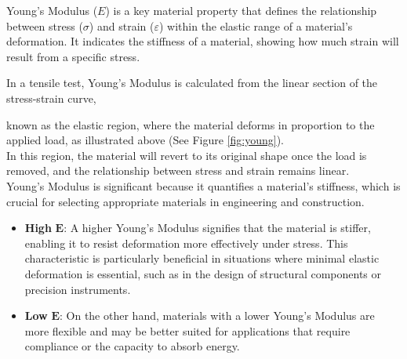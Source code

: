 \documentclass{article}
\begin{document}
{\begin{minipage}{\dimexpr\textwidth-0.55\textwidth\relax}
    Young's Modulus ($E$) is a key material property that defines the relationship between stress ($\sigma$) and strain ($\varepsilon$) within the elastic range of a material's deformation. It indicates the stiffness of a material, showing how much strain will result from a specific stress.
    
    In a tensile test, Young's Modulus is calculated from the linear section of the stress-strain curve, 
\end{minipage}
known as the elastic region, where the material deforms in proportion to the applied load, as illustrated above (See Figure \ref{fig:young}).\\[8pt]  
In this region, the material will revert to its original shape once the load is removed, and the relationship between stress and strain remains linear.\\[8pt] 
Young's Modulus is significant because it quantifies a material's stiffness, which is crucial for selecting appropriate materials in engineering and construction.
\begin{itemize}
    \item \textbf{High }\(\bm{E}\): A higher Young's Modulus signifies that the material is stiffer, enabling it to resist deformation more effectively under stress. This characteristic is particularly beneficial in situations where minimal elastic deformation is essential, such as in the design of structural components or precision instruments.
    \item \textbf{Low }\(\bm{E}\): On the other hand, materials with a lower Young's Modulus are more flexible and may be better suited for applications that require compliance or the capacity to absorb energy.
\end{itemize}
    \newpage

}
\end{document}
